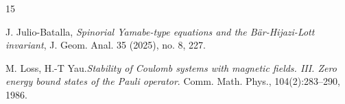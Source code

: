 \documentclass[11pt]{amsart}
\theoremstyle{plain}
\numberwithin{equation}{section}
\theoremstyle{plain}
\begin{document}
\begin{thebibliography}{15}









 J. Julio-Batalla, {\it Spinorial Yamabe-type equations and the Bär-Hijazi-Lott invariant}, J. Geom. Anal. 35 (2025), no. 8, 227.



  M. Loss, H.-T Yau.{\it Stability of Coulomb systems with magnetic fields. III. Zero energy
bound states of the Pauli operator}. Comm. Math. Phys., 104(2):283–290, 1986. 





\end{thebibliography}
\end{document}
